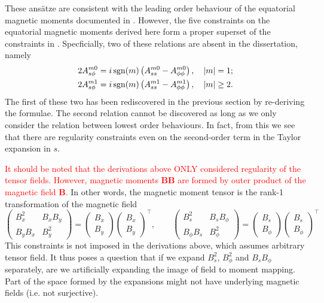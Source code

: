 These ansätze are consistent with the leading order behaviour of the equatorial magnetic moments documented in \textcite{holdenried-chernoff_long_2021}. However, the five constraints on the equatorial magnetic moments derived here form a proper superset of the constraints in \textcite{holdenried-chernoff_long_2021}. Specficially, two of these relations are absent in the dissertation, namely
\[
\begin{aligned}
    2 A_{s\phi}^{m0} = i\operatorname{sgn}(m) \left(A_{ss}^{m0} - A_{\phi\phi}^{m0}\right),\quad |m|=1;\\
    2A_{s\phi}^{m1} = i\operatorname{sgn}(m) \left(A_{ss}^{m1} - A_{\phi\phi}^{m1}\right),\quad |m|\geq 2.
\end{aligned}
\]
The first of these two has been rediscovered in the previous section by re-deriving the formulae. The second relation cannot be discovered as long as we only consider the relation between lowest order behaviours. In fact, from this we see that there are regularity constraints even on the second-order term in the Taylor expansion in $s$.

\textcolor{red}{It should be noted that the derivations above ONLY considered regularity of the tensor fields. However, magnetic moments $\mathbf{B}\mathbf{B}$ are formed by outer product of the magnetic field $\mathbf{B}$.} In other words, the magnetic moment tensor is the rank-1 transformation of the magnetic field
\[
    \begin{pmatrix} B_x^2 & B_x B_y \\ B_y B_x & B_y^2 \end{pmatrix} = 
    \begin{pmatrix} B_x \\ B_y \end{pmatrix}
    \begin{pmatrix} B_x \\ B_y \end{pmatrix}^\intercal,\qquad
    \begin{pmatrix} B_s^2 & B_s B_\phi \\ B_\phi B_s & B_\phi^2 \end{pmatrix} = 
    \begin{pmatrix} B_s \\ B_\phi \end{pmatrix}
    \begin{pmatrix} B_s \\ B_\phi \end{pmatrix}^\intercal
\]
This constraints is not imposed in the derivations above, which assumes arbitrary tensor field. It thus poses a question that if we expand $B_s^2$, $B_\phi^2$ and $B_sB_\phi$ separately, are we artificially expanding the image of field to moment mapping. Part of the space formed by the expansions might not have underlying magnetic fields (i.e. not surjective). 

